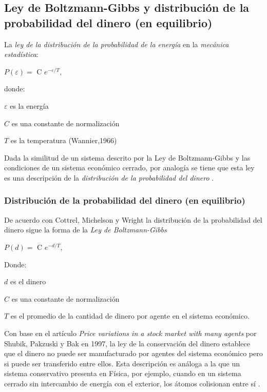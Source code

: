 \subsection{Ley de Boltzmann-Gibbs y distribución de la probabilidad del dinero (en equilibrio)} 

La \textit{ley de la distribución de la probabilidad de la energía} en la \textit{mecánica estadística}:

\begin{center}
$\mathit{P(\varepsilon)} = $ C $e^{-\varepsilon/\mathit{T}}$,
\end{center}
donde:

$\varepsilon$ es la energía

$C$ es una constante de normalización

$\mathit{T}$ es la temperatura (Wannier,1966) 

Dada la similitud de un sistema descrito por la Ley de Boltzmann-Gibbs y las condiciones de un sistema económico cerrado, por analogía se tiene que esta ley es una descripción de la \textit{distribución de la probabilidad del dinero}
\citep[][]{cottrell_classical_2009}.


\subsubsection{Distribución de la probabilidad del dinero (en equilibrio)}


De acuerdo con Cottrel, Michelson y Wright \citep[][]{cottrell_classical_2009} la distribución de la probabilidad del dinero sigue la forma de la \textit{Ley de Boltzmann-Gibbs}


\begin{center}
$\mathit{P(d)} = $ C $e^{-d/\mathit{T}}$,
\end{center}
Donde:

$d$ es el dinero

$C$ es una constante de normalización

$\mathit{T}$ es el promedio de la cantidad de dinero por agente en el sistema económico.

Con base en el artículo \textit{Price variations in a stock market with many agents} por Shubik, Pakzuski y Bak en 1997, la ley de la conservación del dinero establece que el dinero no puede ser manufacturado por agentes del sistema económico pero si puede ser transferido entre ellos. Esta descripción es análoga a la que un sistema conservativo presenta en Física, por ejemplo, cuando en un sistema cerrado sin intercambio de energía con el exterior, los átomos colisionan entre sí \citep[][]{shubik}. 
\newpage

